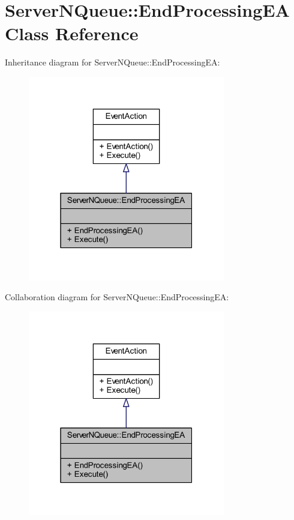 \hypertarget{class_server_n_queue_1_1_end_processing_e_a}{}\section{Server\+N\+Queue\+:\+:End\+Processing\+EA Class Reference}
\label{class_server_n_queue_1_1_end_processing_e_a}


Inheritance diagram for Server\+N\+Queue\+:\+:End\+Processing\+EA\+:
\nopagebreak
\begin{figure}[H]
\begin{center}
\leavevmode
\includegraphics[width=244pt]{class_server_n_queue_1_1_end_processing_e_a__inherit__graph}
\end{center}
\end{figure}


Collaboration diagram for Server\+N\+Queue\+:\+:End\+Processing\+EA\+:
\nopagebreak
\begin{figure}[H]
\begin{center}
\leavevmode
\includegraphics[width=244pt]{class_server_n_queue_1_1_end_processing_e_a__coll__graph}
\end{center}
\end{figure}
